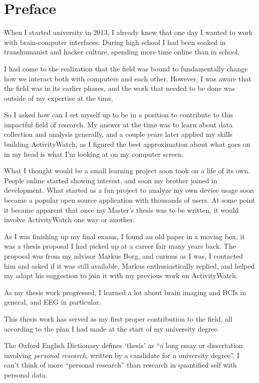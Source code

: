 \section*{Preface}

When I started university in 2013, I already knew that one day I wanted to work with brain-computer interfaces. During high school I had been soaked in transhumanist and hacker culture, spending more time online than in school.

I had come to the realization that the field was bound to fundamentally change how we interact both with computers and each other. However, I was aware that the field was in its earlier phases, and the work that needed to be done was outside of my expertise at the time.

So I asked how can I set myself up to be in a position to contribute to this impactful field of research. My answer at the time was to learn about data collection and analysis generally, and a couple years later applied my skills building ActivityWatch, as I figured the best approximation about what goes on in my head is what I'm looking at on my computer screen.

What I thought would be a small learning project soon took on a life of its own. People online started showing interest, and soon my brother joined in development. What started as a fun project to analyze my own device usage soon became a popular open source application with thousands of users. At some point it became apparent that once my Master's thesis was to be written, it would involve ActivityWatch one way or another.

As I was finishing up my final exams, I found an old paper in a moving box, it was a thesis proposal I had picked up at a career fair many years back. The proposal was from my advisor Markus Borg, and curious as I was, I contacted him and asked if it was still available. Markus enthusiastically replied, and helped my adapt his suggestion to join it with my previous work on ActivityWatch.

As my thesis work progressed, I learned a lot about brain imaging and BCIs in general, and EEG in particular.

This thesis work has served as my first proper contribution to the field, all according to the plan I had made at the start of my university degree.

The Oxford English Dictionary defines `thesis' as ``a long essay or dissertation involving \emph{personal research}, written by a candidate for a university degree''. I can't think of more ``personal research'' than research in quantified self with personal data.
